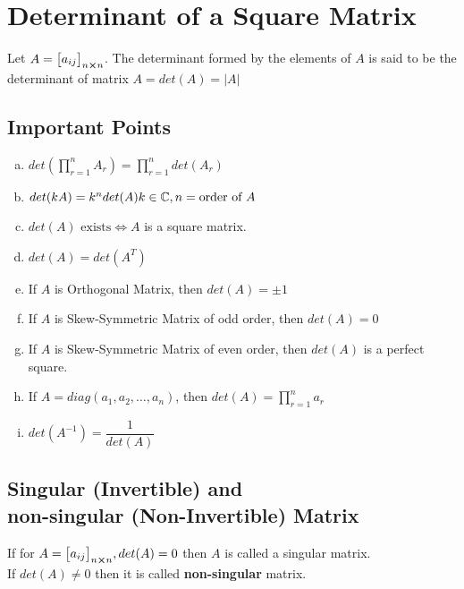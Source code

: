 \documentclass{article}
\begin{document}
\section{Determinant of a Square Matrix}
Let $A={\begin{bmatrix}
        a_{ij}
    \end{bmatrix}}_{n \cross n} $. The determinant formed by the elements of $A$ is said to be the determinant of matrix $A= det(A)= |A|$

\subsection*{Important Points}
\begin{enumerate}[a.]
    \item $det\left(\displaystyle\prod_{r=1}^{n} A_{r}\right)=\displaystyle\prod_{r=1}^{n} det(A_{r}) $
    \item $det(kA)=k^n det(A) \hfill k \in \mathbb{C}, n = \text{order of $A$} $
    \item $det(A) \text{ exists} \iff A$ is a square matrix.
    \item $det(A)=det(A^T) $
    \item If $A$ is Orthogonal Matrix, then $det(A)=\pm 1 $
    \item If $A$ is Skew-Symmetric Matrix of odd order, then $det(A)=0$
    \item If $A$ is Skew-Symmetric Matrix of even order, then $det(A)$ is a perfect square.
    \item If $A=diag(a_{1}, a_{2}, \ldots , a_{n})$, then $det(A)=\displaystyle\prod_{r=1}^{n}a_{r}$
    \item $det(A^{-1})=\dfrac{1}{det(A)}$
\end{enumerate}

\subsection*{Singular (Invertible) and\\ non-singular (Non-Invertible) Matrix}

If for $A={\begin{bmatrix}
        a_{ij}
    \end{bmatrix}}_{n \cross n}, det(A)=0 $ then $A$ is called a \textbf{}{singular} matrix. \\If $det(A) \not= 0$ then it is called \textbf{non-singular} matrix.
\end{document}
